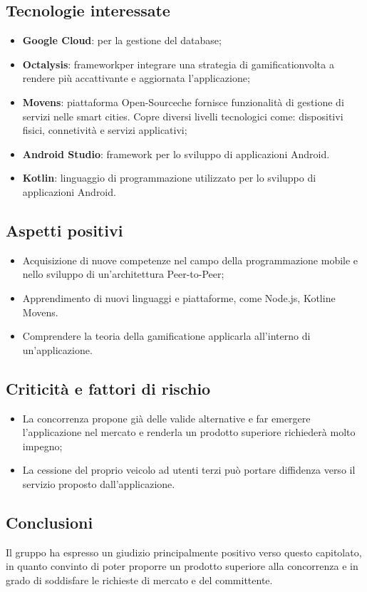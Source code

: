 \subsection{Tecnologie interessate}
\begin{itemize}	
	\item \textbf{Google Cloud}: per la gestione del database;
	\item \textbf{Octalysis\glo}: framework\glosp per integrare una strategia di gamification\glosp volta a rendere più accattivante e aggiornata l'applicazione;
	\item \textbf{Movens\glo}: piattaforma Open-Source\glosp che fornisce funzionalità di gestione di servizi nelle smart cities. Copre diversi livelli tecnologici come: dispositivi fisici, connetività e servizi applicativi;	
	\item \textbf{Android Studio}: framework per lo sviluppo di applicazioni Android\glo.
	\item \textbf{Kotlin\glo}: linguaggio di programmazione utilizzato per lo sviluppo di applicazioni Android.
\end{itemize}
\subsection{Aspetti positivi}
\begin{itemize}
	\item Acquisizione di nuove competenze nel campo della programmazione mobile e nello sviluppo di un'architettura Peer-to-Peer\glo;
	\item Apprendimento di nuovi linguaggi e piattaforme, come Node.js\glo, Kotlin\glosp e Movens\glo.
	\item Comprendere la teoria della gamification\glosp e applicarla all'interno di un'applicazione.
\end{itemize}
\subsection{Criticità e fattori di rischio}
\begin{itemize}
	\item La concorrenza propone già delle valide alternative e far emergere l'applicazione nel mercato e renderla un prodotto superiore richiederà molto impegno;
	\item La cessione del proprio veicolo ad utenti terzi può portare diffidenza verso il servizio proposto dall'applicazione.
\end{itemize}
\subsection{Conclusioni}
Il gruppo ha espresso un giudizio principalmente positivo verso questo capitolato\glo,
in quanto convinto di poter proporre un prodotto superiore alla concorrenza e in grado di soddisfare le richieste di mercato e del committente.
